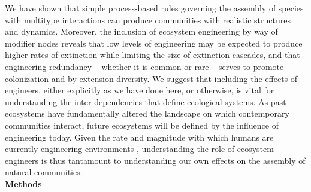 \documentclass[twocolumn,preprintnumbers,amsmath,amssymb,superscriptaddress,linenumbers]{revtex4-1}
\newcommand{\rev}[1]{\textcolor{crimson}{#1}}
\providecommand{\DIFadd}[1]{{\protect\color{blue}\uwave{#1}}} %
\providecommand{\DIFaddbegin}{} %
\providecommand{\DIFaddend}{} %
\providecommand{\DIFdelbegin}{} %
\newcommand{\DIFscaledelfig}{0.5}
\newlength{\DIFdelgraphicswidth} %
\newlength{\DIFdelgraphicsheight} %
\newcommand{\DIFaddincludegraphics}[2][]{{\color{blue}\fbox{\DIFOincludegraphics[#1]{#2}}}} %
\newcommand{\DIFdelincludegraphics}[2][]{%
\sbox{\DIFdelgraphicsbox}{\DIFOincludegraphics[#1]{#2}}%
\settoboxwidth{\DIFdelgraphicswidth}{\DIFdelgraphicsbox} %
\settoboxtotalheight{\DIFdelgraphicsheight}{\DIFdelgraphicsbox} %
\scalebox{\DIFscaledelfig}{%
\parbox[b]{\DIFdelgraphicswidth}{\usebox{\DIFdelgraphicsbox}\\[-\baselineskip] \rule{\DIFdelgraphicswidth}{0em}}\llap{\resizebox{\DIFdelgraphicswidth}{\DIFdelgraphicsheight}{%
\setlength{\unitlength}{\DIFdelgraphicswidth}%
\begin{picture}(1,1)%
\thicklines\linethickness{2pt} %
{\color[rgb]{1,0,0}\put(0,0){\framebox(1,1){}}}%
{\color[rgb]{1,0,0}\put(0,0){\line( 1,1){1}}}%
{\color[rgb]{1,0,0}\put(0,1){\line(1,-1){1}}}%
\end{picture}%
}\hspace*{3pt}}} %
} %
\DeclareRobustCommand{\DIFaddbegin}{\DIFOaddbegin \let\includegraphics\DIFaddincludegraphics} %
\DeclareRobustCommand{\DIFaddend}{\DIFOaddend \let\includegraphics\DIFOincludegraphics} %
\DeclareRobustCommand{\DIFdelbegin}{\DIFOdelbegin \let\includegraphics\DIFdelincludegraphics} %
\begin{document}
We have shown that simple process-based rules governing the assembly of species with multitype interactions can produce communities with realistic structures and dynamics.
Moreover, the inclusion of ecosystem engineering by way of modifier nodes reveals that low levels of engineering may be expected to produce higher rates of extinction while limiting the size of extinction cascades, and that engineering redundancy -- whether it is common or rare -- serves to promote colonization and by extension \DIFaddbegin \DIFadd{community }\DIFaddend diversity.
We suggest that including the effects of engineers, either explicitly as we have done here, or otherwise, is vital for understanding the inter-dependencies that define ecological systems.
As past ecosystems have fundamentally altered the landscape on which contemporary communities interact, future ecosystems will be defined by the influence of engineering today.
Given the rate and magnitude with which humans are currently engineering environments \cite{Corlett2015}, understanding the role of ecosystem engineers is thus tantamount to understanding our own effects on the assembly of natural communities.\\






\vspace{-2mm}
\noindent \textbf{Methods}\\
  \DIFdelbegin %
\end{document}
